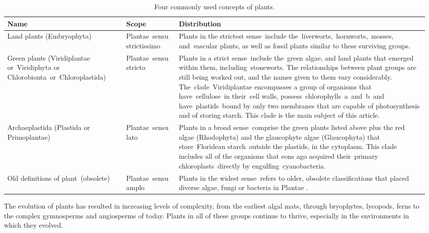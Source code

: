 \begin{table}

\caption{\label{tab:plants}Four commonly used concepts of plants.}
\centering
\begin{tabular}[t]{>{\raggedright\arraybackslash}p{20em}>{\raggedright\arraybackslash}p{20em}>{\raggedright\arraybackslash}p{25em}}
\toprule
Name & Scope & Distribution\\
\midrule
\rowcolor{gray!6} Land plants (Embryophyta) & Plantae sensu strictissimo & Plants in the strictest sense include the liverworts, hornworts, mosses, and vascular plants, as well as fossil plants similar to these surviving groups.\\
Green plants (Viridiplantae or Viridiphyta or Chlorobionta or Chloroplastida) & Plantae sensu stricto & Plants in a strict sense include the green algae, and land plants that emerged within them, including stoneworts. The relationships between plant groups are still being worked out, and the names given to them vary considerably. The clade Viridiplantae encompasses a group of organisms that have cellulose in their cell walls, possess chlorophylls a and b and have plastids bound by only two membranes that are capable of photosynthesis and of storing starch. This clade is the main subject of this article.\\
\rowcolor{gray!6} Archaeplastida (Plastida or Primoplantae) & Plantae sensu lato & Plants in a broad sense comprise the green plants listed above plus the red algae (Rhodophyta) and the glaucophyte algae (Glaucophyta) that store Floridean starch outside the plastids, in the cytoplasm. This clade includes all of the organisms that eons ago acquired their primary chloroplasts directly by engulfing cyanobacteria.\\
Old definitions of plant (obsolete) & Plantae sensu amplo & Plants in the widest sense refers to older, obsolete classifications that placed diverse algae, fungi or bacteria in Plantae .\\
\bottomrule
\end{tabular}
\end{table}

\twocolumn

The evolution of plants has resulted in increasing levels of complexity, from the earliest algal mats, through bryophytes, lycopods, ferns to the complex gymnosperms and angiosperms of today. Plants in all of these groups continue to thrive, especially in the environments in which they evolved.

